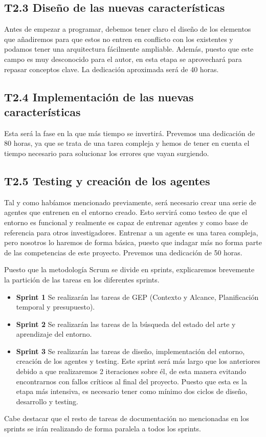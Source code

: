 \subsection*{T2.3 Diseño de las nuevas características}
Antes de empezar a programar, debemos tener claro el diseño de los elementos que añadiremos para que estos no entren en conflicto con los existentes y podamos tener una arquitectura fácilmente ampliable. Además, puesto que este campo es muy desconocido para el autor, en esta etapa se aprovechará para repasar conceptos clave. La dedicación aproximada será de 40 horas.

\subsection*{T2.4 Implementación de las nuevas características}
Esta será la fase en la que más tiempo se invertirá. Prevemos una dedicación de 80 horas, ya que se trata de una tarea compleja y hemos de tener en cuenta el tiempo necesario para solucionar los errores que vayan surgiendo.

\subsection*{T2.5 Testing y creación de los agentes}
Tal y como habíamos mencionado previamente, será necesario crear una serie de agentes que entrenen en el entorno creado. Esto servirá como testeo de que el entorno es funcional y realmente es capaz de entrenar agentes y como base de referencia para otros investigadores. Entrenar a un agente es una tarea compleja, pero nosotros lo haremos de forma básica, puesto que indagar más no forma parte de las competencias de este proyecto. Prevemos una dedicación de 50 horas.  

Puesto que la metodología Scrum se divide en sprints, explicaremos brevemente la partición de las tareas en los diferentes sprints.
\begin{itemize}
    \item \textbf{Sprint 1} Se realizarán las tareas de GEP (Contexto y Alcance, Planificación temporal y presupuesto).
    \item \textbf{Sprint 2} Se realizarán las tareas de la búsqueda del estado del arte y aprendizaje del entorno.
    \item \textbf{Sprint 3} Se realizarán las tareas de diseño, implementación del entorno, creación de los agentes y testing. Este sprint será más largo que los anteriores debido a que realizaremos 2 iteraciones sobre él, de esta manera evitando encontrarnos con fallos críticos al final del proyecto. Puesto que esta es la etapa más intensiva, es necesario tener como mínimo dos ciclos de diseño, desarrollo y testing. 
\end{itemize}
Cabe destacar que el resto de tareas de documentación no mencionadas en los sprints se irán realizando de forma paralela a todos los sprints.


